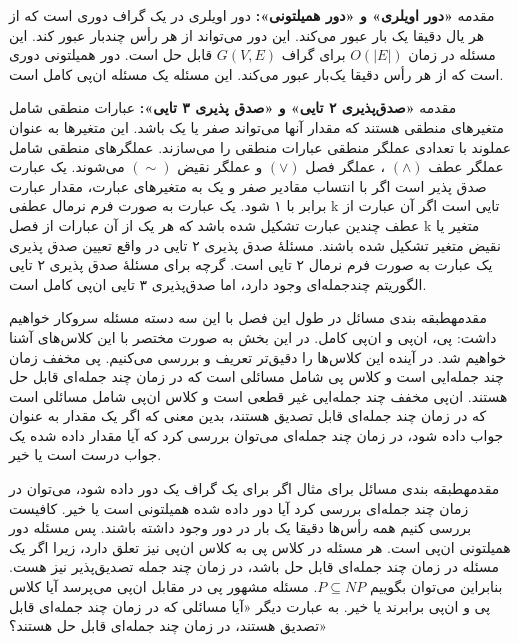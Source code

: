 \begin{itemframe}{مقدمه}
\itm
\textbf{«دور اویلری» و «دور همیلتونی»:}
دور اویلری
در یک گراف دوری است که از هر یال دقیقا یک بار عبور می‌کند. این دور می‌تواند از هر رأس چندبار عبور کند. این مسئله در زمان
$O(|E|)$
برای گراف
$G(V,E)$
قابل حل است. دور همیلتونی
 دوری است که از هر رأس دقیقا یک‌بار عبور می‌کند. این مسئله یک مسئله ان‌پی کامل است.
\end{itemframe}

\begin{itemframe}{مقدمه}
\itm
\textbf{«صدق‌پذیری ۲ تایی» و «صدق پذیری ۳ تایی»: }
عبارات منطقی شامل متغیرهای منطقی هستند که مقدار آنها می‌تواند صفر یا یک باشد. این متغیرها به عنوان عملوند با تعدادی عملگر منطقی عبارات منطقی را می‌سازند. عملگرهای منطقی شامل عملگر عطف
$(\wedge)$
، عملگر فصل
$(\vee)$
و عملگر نقیض
$(\sim)$
می‌شوند.
\sub
یک عبارت صدق پذیر
است اگر با انتساب مقادیر صفر و یک به متغیرهای عبارت، مقدار عبارت برابر با ۱ شود. یک عبارت به صورت فرم نرمال عطفی k تایی است اگر آن عبارت از عطف چندین عبارت تشکیل شده باشد که هر یک از آن عبارات از فصل k متغیر یا نقیض متغیر تشکیل شده باشند.
\sub
مسئلهٔ صدق پذیری ۲ تایی در واقع تعیین صدق پذیری یک عبارت به صورت فرم نرمال ۲ تایی است. گرچه برای مسئلهٔ صدق پذیری ۲ تایی الگوریتم چندجمله‌ای وجود دارد، اما صدق‌پذیری ۳ تایی ان‌پی کامل است.
\end{itemframe}

\begin{itemframe-s}{مقدمه}{طبقه بندی مسائل}
\itm
در طول این فصل با این سه دسته مسئله سروکار خواهیم داشت: پی، ان‌پی و ان‌پی کامل. در این بخش به صورت مختصر با این کلاس‌های آشنا خواهیم شد. در آینده این کلاس‌ها را دقیق‌تر تعریف و بررسی می‌کنیم.
\itm
پی مخفف زمان چند جمله‌ایی است
 و کلاس پی
شامل مسائلی است که در زمان چند جمله‌ای قابل حل هستند.
\itm
ان‌پی مخفف چند جمله‌ایی غیر قطعی
 است و کلاس ان‌پی
شامل مسائلی است که در زمان چند جمله‌ای قابل تصدیق
هستند، بدین معنی که اگر یک مقدار به عنوان جواب داده شود، در زمان چند جمله‌ای می‌توان بررسی کرد که آیا مقدار داده شده یک جواب درست است یا خیر.

\end{itemframe-s}

\begin{itemframe-s}{مقدمه}{طبقه بندی مسائل}
\itm
برای مثال اگر برای یک گراف یک دور داده شود، می‌توان در زمان چند جمله‌ای بررسی کرد آیا دور داده شده همیلتونی است یا خیر. کافیست بررسی کنیم همه رأس‌ها دقیقا یک بار در دور وجود داشته باشند. پس مسئله دور همیلتونی ان‌پی است.
\itm
هر مسئله در کلاس پی به کلاس ان‌پی نیز تعلق دارد، زیرا اگر یک مسئله در زمان چند جمله‌ای قابل حل باشد، در زمان چند جمله تصدیق‌پذیر نیز هست. بنابراین می‌توان بگوییم
$P \subseteq NP$.
\itm
مسئله مشهور پی در مقابل ان‌پی
می‌پرسد آیا کلاس پی و ان‌پی برابرند یا خیر. به عبارت دیگر «آیا مسائلی که در زمان چند جمله‌ای قابل تصدیق هستند، در زمان چند جمله‌ای قابل حل هستند؟»
\end{itemframe-s}

